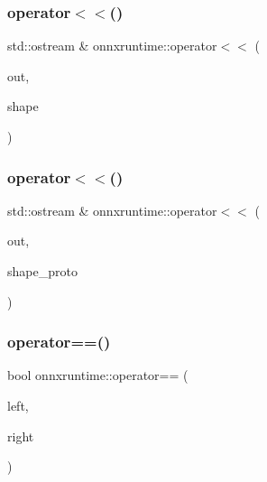 \mbox{\label{namespaceonnxruntime_a593517991ad6342492078022c80da708}} 
\subsubsection{\texorpdfstring{operator$<$$<$()}{operator<<()}\hspace{0.1cm}{\footnotesize\ttfamily [4/5]}}
{\footnotesize\ttfamily std\+::ostream \& onnxruntime\+::operator$<$$<$ (\begin{DoxyParamCaption}\item[{std\+::ostream \&}]{out,  }\item[{const \+::\mbox{\hyperlink{classonnxruntime_1_1TensorShape}{onnxruntime\+::\+Tensor\+Shape}} \&}]{shape }\end{DoxyParamCaption})}

\mbox{\label{namespaceonnxruntime_a9e563626aaf5aadb70ad636c14b07af2}} 
\subsubsection{\texorpdfstring{operator$<$$<$()}{operator<<()}\hspace{0.1cm}{\footnotesize\ttfamily [5/5]}}
{\footnotesize\ttfamily std\+::ostream \& onnxruntime\+::operator$<$$<$ (\begin{DoxyParamCaption}\item[{std\+::ostream \&}]{out,  }\item[{const O\+N\+N\+X\+\_\+\+N\+A\+M\+E\+S\+P\+A\+C\+E\+::\+Tensor\+Shape\+Proto \&}]{shape\+\_\+proto }\end{DoxyParamCaption})}

\mbox{\label{namespaceonnxruntime_a85d9f4ce255300d63e45549fc9c073ba}} 
\subsubsection{\texorpdfstring{operator==()}{operator==()}}
{\footnotesize\ttfamily bool onnxruntime\+::operator== (\begin{DoxyParamCaption}\item[{const \mbox{\hyperlink{uniononnxruntime_1_1MLFloat16}{M\+L\+Float16}} \&}]{left,  }\item[{const \mbox{\hyperlink{uniononnxruntime_1_1MLFloat16}{M\+L\+Float16}} \&}]{right }\end{DoxyParamCaption})\hspace{0.3cm}{\ttfamily [inline]}}

